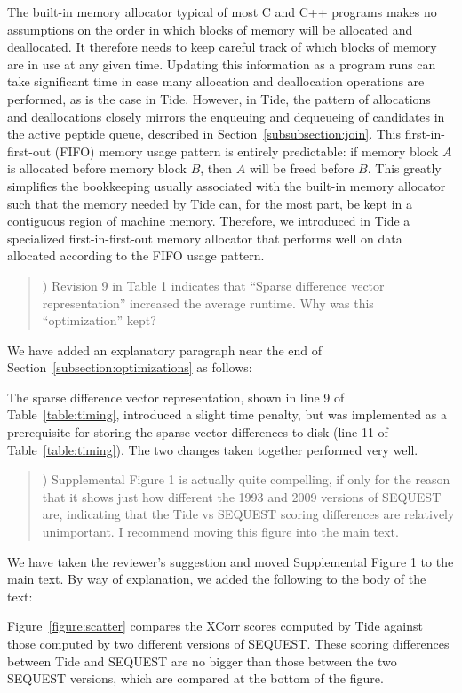 \documentclass{article}
\newcommand{\breview}{\begin{quotation}\begin{em}\noindent}
\newcommand{\ereview}{\end{em}\end{quotation}}
\begin{document}
The built-in memory allocator typical of most C and C++ programs makes
no assumptions on the order in which blocks of memory will be
allocated and deallocated. It therefore needs to keep careful track of
which blocks of memory are in use at any given time. Updating this
information as a program runs can take significant time in case many
allocation and deallocation operations are performed, as is the case
in Tide. However, in Tide, the pattern of allocations and
deallocations closely mirrors the enqueuing and dequeueing of
candidates in the active peptide queue, described in
Section~\ref{subsubsection:join}. This first-in-first-out (FIFO)
memory usage pattern is entirely predictable: if memory block $A$ is
allocated before memory block $B$, then $A$ will be freed before
$B$. This greatly simplifies the bookkeeping usually associated with
the built-in memory allocator such that the memory needed by Tide can,
for the most part, be kept in a contiguous region of machine
memory. Therefore, we introduced in Tide a specialized
first-in-first-out memory allocator that performs well on data
allocated according to the FIFO usage pattern.

\breview 4) Revision 9 in Table 1 indicates that ``Sparse difference
vector representation'' increased the average runtime.  Why was this
``optimization'' kept?
\ereview

We have added an explanatory paragraph near the end of
Section~\ref{subsection:optimizations} as follows:

The sparse difference vector representation, shown in line 9 of
Table~\ref{table:timing}, introduced a slight time penalty, but was
implemented as a prerequisite for storing the sparse vector
differences to disk (line 11 of Table~\ref{table:timing}). The two
changes taken together performed very well.

\breview 5) Supplemental Figure 1 is actually quite compelling, if
only for the reason that it shows just how different the 1993 and 2009
versions of SEQUEST are, indicating that the Tide vs SEQUEST scoring
differences are relatively unimportant.  I recommend moving this
figure into the main text.
\ereview

We have taken the reviewer's suggestion and moved Supplemental Figure
1 to the main text. By way of explanation, we added the following to
the body of the text:

Figure~\ref{figure:scatter} compares the XCorr scores computed by
Tide against those computed by two different versions of
SEQUEST. These scoring differences between Tide and SEQUEST are no
bigger than those between the two SEQUEST versions, which are compared
at the bottom of the figure.
\end{document}
